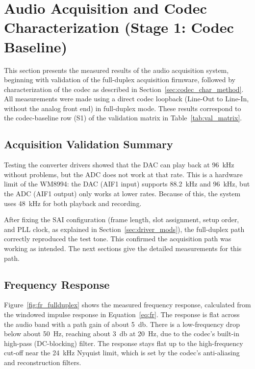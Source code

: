 \section{Audio Acquisition and Codec Characterization (Stage 1: Codec Baseline)}
\label{sec:audio_results}

This section presents the measured results of the audio acquisition system, beginning with validation of the full-duplex acquisition firmware, followed by characterization of the codec as described in Section~\ref{sec:codec_char_method}. All measurements were made using a direct codec loopback (Line-Out to Line-In, without the analog front end) in full-duplex mode. These results correspond to the codec-baseline row (S1) of the validation matrix in Table~\ref{tab:val_matrix}.

\subsection{Acquisition Validation Summary}
\label{sec:res_validation_summary}

Testing the converter drivers showed that the DAC can play back at \SI{96}{\kHz} without problems, but the ADC does not work at that rate. This is a hardware limit of the WM8994: the DAC (AIF1 input) supports \SI{88.2}{\kHz} and \SI{96}{\kHz}, but the ADC (AIF1 output) only works at lower rates. Because of this, the system uses \SI{48}{\kHz} for both playback and recording.

After fixing the SAI configuration (frame length, slot assignment, setup order, and PLL clock, as explained in Section~\ref{sec:driver_mods}), the full-duplex path correctly reproduced the test tone. This confirmed the acquisition path was working as intended. The next sections give the detailed measurements for this path.

\subsection{Frequency Response}
\label{sec:res_fr}

Figure~\ref{fig:fr_fullduplex} shows the measured frequency response, calculated from the windowed impulse response in Equation~\eqref{eq:fr}. The response is flat across the audio band with a path gain of about \SI{5}{\decibel}. There is a low-frequency drop below about \SI{50}{\hertz}, reaching about \SI{3}{\decibel} at \SI{20}{\hertz}, due to the codec's built-in high-pass (DC-blocking) filter. The response stays flat up to the high-frequency cut-off near the \SI{24}{\kilo\hertz} Nyquist limit, which is set by the codec's anti-aliasing and reconstruction filters.

